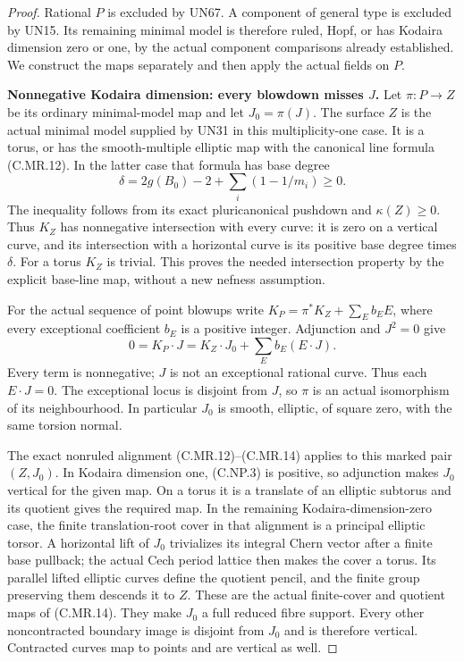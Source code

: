 \begin{proof}
Rational \(P\) is excluded by UN67. A component
of general type is excluded by UN15. Its remaining
minimal model is therefore ruled, Hopf, or has
Kodaira dimension zero or one, by the actual
component comparisons already established.
We construct the maps separately and then
apply the actual fields on \(P\).

\par\medskip\noindent\textbf{Nonnegative Kodaira dimension: every blowdown misses \(J\).}
Let \(\pi:P\to Z\) be its ordinary minimal-model
map and let \(J_0=\pi(J)\). The surface \(Z\)
is the actual minimal model supplied by
UN31 in this multiplicity-one case. It is
a torus, or has the smooth-multiple elliptic
map with the canonical line formula
(C.MR.12). In the latter case that formula
has base degree
\[
       \delta=2g(B_0)-2+\sum_i(1-1/m_i)\ge0 .
 \tag{C.NP.3}
\]
The inequality follows from its exact
pluricanonical pushdown and
\(\kappa(Z)\ge0\). Thus \(K_Z\) has
nonnegative intersection with every
curve: it is zero on a vertical
curve, and its intersection with
a horizontal curve is its positive
base degree times \(\delta\).
For a torus \(K_Z\) is trivial.
This proves the needed intersection
property by the explicit base-line
map, without a new nefness assumption.

For the actual sequence of point
blowups write
\(K_P=\pi^*K_Z+\sum_E b_EE\),
where every exceptional coefficient
\(b_E\) is a positive integer.
Adjunction and \(J^2=0\) give
\[
       0=K_P\cdot J
          =K_Z\cdot J_0+\sum_E b_E(E\cdot J).
 \tag{C.NP.4}
\]
Every term is nonnegative; \(J\)
is not an exceptional rational
curve. Thus each \(E\cdot J=0\).
The exceptional locus is disjoint
from \(J\), so \(\pi\) is an
actual isomorphism of its
neighbourhood. In particular
\(J_0\) is smooth, elliptic,
of square zero, with the
same torsion normal.

The exact nonruled alignment
(C.MR.12)--(C.MR.14) applies
to this marked pair \((Z,J_0)\).
In Kodaira dimension one,
(C.NP.3) is positive, so
adjunction makes \(J_0\)
vertical for the given map.
On a torus it is a translate
of an elliptic subtorus and
its quotient gives the
required map. In the remaining
Kodaira-dimension-zero case,
the finite translation-root
cover in that alignment is a
principal elliptic torsor.
A horizontal lift of \(J_0\)
trivializes its integral Chern
vector after a finite base
pullback; the actual Cech
period lattice then makes
the cover a torus. Its
parallel lifted elliptic
curves define the quotient
pencil, and the finite
group preserving them
descends it to \(Z\).
These are the actual
finite-cover and quotient
maps of (C.MR.14).
They make \(J_0\) a full
reduced fibre support.
Every other noncontracted
boundary image is disjoint
from \(J_0\) and is therefore
vertical. Contracted curves
map to points and are
vertical as well.


\end{proof}
